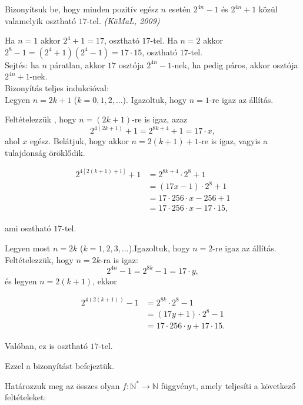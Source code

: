 \begin{extraproblem}
Bizonyítsuk be, hogy minden pozitív egész $n$ esetén $2^{4n}-1$
és $2^{4n}+1$ közül valamelyik osztható $17$-tel. \emph{(KöMaL,
2009) }
\end{extraproblem}

\begin{solution}
Ha $n=1$ akkor $2^{4}+1=17$, osztható $17$-tel. Ha $n=2$ akkor
$2^{8}-1=(2^{4}+1)(2^{4}-1)=17\cdot15$, osztható $17$-tel. \\

Sejtés: ha $n$ páratlan, akkor $17$ osztója $2^{4n}-1$-nek, ha
pedig páros, akkor osztója $2^{4n}+1$-nek. \\

Bizonyítás teljes indukcióval:\\

Legyen $n=2k+1$ ($k=0,1,2,\dots$). Igazoltuk, hogy $n=1$-re igaz
az állítás.

Feltételezzük , hogy $n=(2k+1)$-re is igaz, azaz 
\[
2^{4(2k+1)}+1=2^{8k+4}+1=17\cdot x,
\]
ahol $x$ egész. Belátjuk, hogy akkor $n=2(k+1)+1$-re is igaz, vagyis
a tulajdonság öröklődik.

\begin{align*}
2^{4[2(k+1)+1]}+1 & =2^{8k+4}\cdot2^{8}+1\\
 & =(17x-1)\cdot2^{8}+1\\
 & =17\cdot256\cdot x-256+1\\
 & =17\cdot256\cdot x-17\cdot15,
\end{align*}

ami osztható $17$-tel.

Legyen most $n=2k$ ($k=1,2,3,\dots$).Igazoltuk, hogy $n=2$-re igaz
az állítás. Feltételezzük, hogy $n=2k$-ra is igaz: 
\[
2^{4n}-1=2^{8k}-1=17\cdot y,
\]
és legyen $n=2(k+1)$, ekkor

\begin{align*}
2^{4(2(k+1))}-1 & =2^{8k}\cdot2^{8}-1\\
 & =(17y+1)\cdot2^{8}-1\\
 & =17\cdot256\cdot y+17\cdot15.
\end{align*}

Valóban, ez is osztható $17$-tel.

Ezzel a bizonyítást befejeztük. 
\end{solution}
\begin{extraproblem}
Határozzuk meg az összes olyan $f:\mathbb{N^{*}}\to\mathbb{N}$ függvényt,
amely teljesíti a következő feltételeket:
\end{extraproblem}

